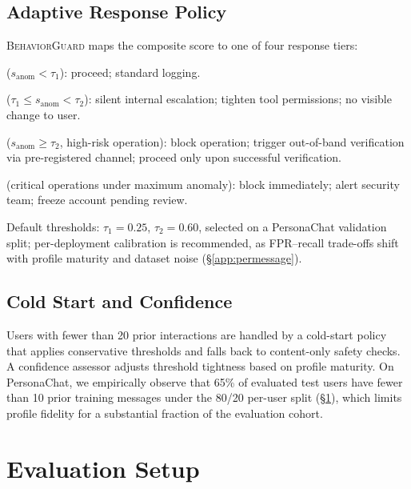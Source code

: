 \documentclass[conference]{IEEEtran}
\newcommand{\BG}{\textsc{BehaviorGuard}}
\newcommand{\anomaly}{s_{\mathrm{anom}}}
\begin{document}
\subsection{Adaptive Response Policy}
\label{sec:policy}

\BG{} maps the composite score to one of four response tiers:
\begin{description}[noitemsep]
  \item[\textsc{Allow Normal}] ($\anomaly < \tau_1$): proceed; standard logging.
  \item[\textsc{Allow with Caution}] ($\tau_1 \le \anomaly < \tau_2$): silent internal
       escalation; tighten tool permissions; no visible change to user.
  \item[\textsc{Block and Verify OOB}] ($\anomaly \ge \tau_2$, high-risk operation):
       block operation; trigger out-of-band verification via pre-registered channel;
       proceed only upon successful verification.
  \item[\textsc{Escalate to Human}] (critical operations under maximum anomaly):
       block immediately; alert security team; freeze account pending review.
\end{description}
Default thresholds: $\tau_1 = 0.25$, $\tau_2 = 0.60$, selected on a PersonaChat
validation split; per-deployment calibration is recommended, as FPR--recall trade-offs
shift with profile maturity and dataset noise (\S\ref{app:permessage}).

\subsection{Cold Start and Confidence}

Users with fewer than 20 prior interactions are handled by a cold-start policy that
applies conservative thresholds and falls back to content-only safety checks.
A confidence assessor adjusts threshold tightness based on profile maturity.
On PersonaChat, we empirically observe that 65\% of evaluated test users have fewer
than 10 prior training messages under the 80/20 per-user split (\S\ref{sec:setup}),
which limits profile fidelity for a substantial fraction of the evaluation cohort.


\section{Evaluation Setup}
\label{sec:setup}
\end{document}

